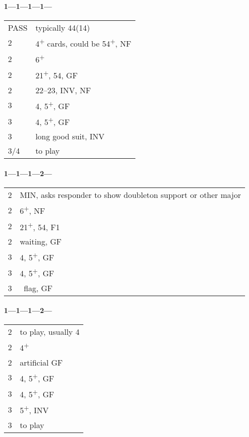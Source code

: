 \documentclass[11pt]{article}
\renewcommand{\C}{\texorpdfstring{\textcolor{ForestGreen}{\raisebox{-0.017em}{\ensuremath{\varclub}}}}{C}}
\newcommand{\D}{\texorpdfstring{\textcolor{YellowOrange}{\raisebox{-0.35pt}{\ensuremath{\vardiamond}}}}{D}}
\renewcommand{\H}{\texorpdfstring{\textcolor{Red}{\raisebox{-0.06em}{\ensuremath{\varheart}}}}{H}}
\renewcommand{\S}{\texorpdfstring{\raisebox{-0.03em}{\ensuremath{\varspade}}}{S}}
\newcommand{\N}{\texorpdfstring{\textcolor{Cerulean}{\raisebox{0.15em}{\scalebox{0.72}{\ensuremath{\bigodot}}}}}{NT}}
\newcommand{\+}{\textsuperscript{+}}
\renewcommand{\P}{\texorpdfstring{{\footnotesize{PASS}}}{PASS}}
\newenvironment{bidtable}{%
	\begin{tabular}{l l}%
}{%
	\end{tabular}%
}
\begin{document}
\paragraph{1\C---1\D---1\H---1\protect\N---} \label{1C1D1H1N}

\begin{bidtable}
    \P & typically 44(14) \\
    2\C\D & 4\+ cards, could be 54\+, NF \\
    2\H & 6\+\H \\
    2\S & 21\+, 5\H 4\S, GF \\
    2\N & 22--23, INV, NF \\
    3\C & 4\H, 5\+\C, GF \\
    3\D & 4\H, 5\+\D, GF \\
    3\H & long good suit, INV \\
    3\N/4\H & to play \\
\end{bidtable}

\paragraph{1\C---1\D---1\H---2\C---} \label{1C1D1H2C}

\begin{bidtable}
    2\D & MIN, asks responder to show doubleton support or other major\\
    2\H & 6\+\H, NF \\
    2\S & 21\+, 5\H 4\S, F1 \\
    2\N & waiting, GF \\
    3\C & 4\H, 5\+\C, GF \\
    3\D & 4\H, 5\+\D, GF \\
    3\H & \H\ flag, GF \\
\end{bidtable}

\paragraph{1\C---1\D---1\H---2\D---} \label{1C1D1H2D}

\begin{bidtable}
    2\H & to play, usually 4\H \\
    2\S & 4\+\S \\
    2\N & artificial GF \\
    3\C & 4\H, 5\+\C, GF \\
    3\D & 4\H, 5\+\D, GF \\
    3\H & 5\+\H, INV \\
    3\N & to play \\
\end{bidtable}
\end{document}
